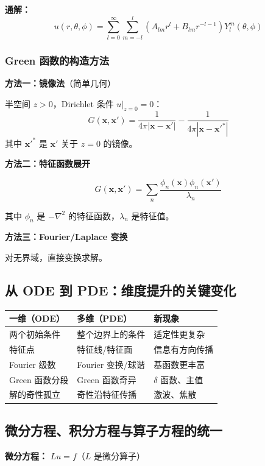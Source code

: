 \textbf{通解：}
\[
u(r,\theta,\phi) = \sum_{l=0}^{\infty}\sum_{m=-l}^{l} \left(A_{lm}r^l + B_{lm}r^{-l-1}\right)Y_l^m(\theta,\phi)
\]

\subsubsection{Green 函数的构造方法}

\textbf{方法一：镜像法}（简单几何）

半空间 $z > 0$，Dirichlet 条件 $u|_{z=0} = 0$：
\[
G(\mathbf{x}, \mathbf{x}') = \frac{1}{4\pi|\mathbf{x}-\mathbf{x}'|} - \frac{1}{4\pi|\mathbf{x}-\mathbf{x}'^*|}
\]
其中 $\mathbf{x}'^*$ 是 $\mathbf{x}'$ 关于 $z=0$ 的镜像。

\textbf{方法二：特征函数展开}

\[
G(\mathbf{x}, \mathbf{x}') = \sum_n \frac{\phi_n(\mathbf{x})\phi_n(\mathbf{x}')}{\lambda_n}
\]

其中 $\phi_n$ 是 $-\nabla^2$ 的特征函数，$\lambda_n$ 是特征值。

\textbf{方法三：Fourier/Laplace 变换}

对无界域，直接变换求解。

\subsection{从 ODE 到 PDE：维度提升的关键变化}

\begin{center}
\begin{tabular}{L{3cm}L{4cm}L{4cm}}
\toprule
\textbf{一维（ODE）} & \textbf{多维（PDE）} & \textbf{新现象} \\
\midrule
两个初始条件 & 整个边界上的条件 & 适定性更复杂 \\
特征点 & 特征线/特征面 & 信息有方向传播 \\
Fourier 级数 & Fourier 变换/球谐 & 基函数更丰富 \\
Green 函数分段 & Green 函数奇异 & $\delta$ 函数、主值 \\
解的奇性孤立 & 奇性沿特征传播 & 激波、焦散 \\
\bottomrule
\end{tabular}
\end{center}

\subsection{微分方程、积分方程与算子方程的统一}

\textbf{微分方程：} $Lu = f$（$L$ 是微分算子）

